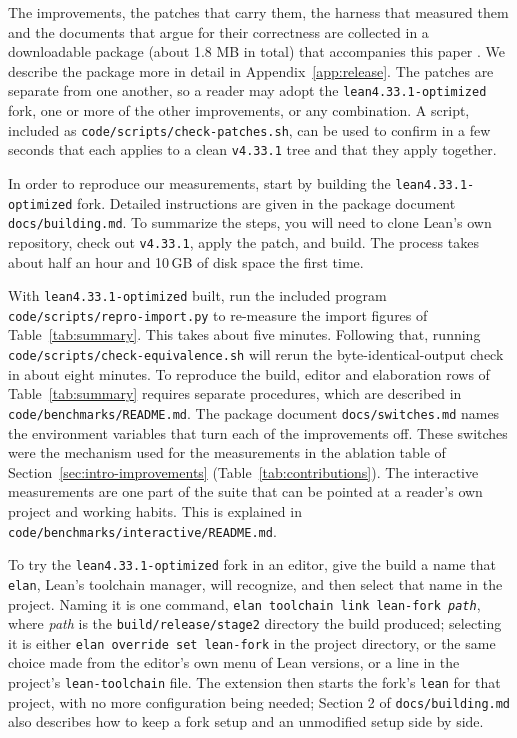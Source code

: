 \documentclass{article}
\newcommand{\Lean}{Lean\xspace}      %
\newcommand{\altlean}{\texttt{lean4.33.1-\allowbreak optimized}\xspace}
\begin{document}
The improvements, the patches that carry them, the harness that measured them and the documents
that argue for their correctness are collected in a downloadable package (about 1.8 MB in total) that accompanies this paper \cite{package}. We describe the package more in detail in Appendix~\ref{app:release}. The patches are separate from one another, so a
reader may adopt the \altlean fork, one or more of the other improvements, or any combination. A script, included as \texttt{code/scripts/\allowbreak check-patches.sh}, can be used to confirm in a few seconds that each applies to a clean \texttt{v4.33.1} tree and that they apply together.

In order to reproduce our measurements, start by building the \altlean fork. Detailed instructions are given in the package document \texttt{docs/building.md}. To summarize the steps, you will need to clone \Lean's own repository, check out \texttt{v4.33.1}, apply the patch, and build. The process takes about half an hour and 10\,GB of disk space the first time. 

With \altlean built, run the included program \texttt{code/scripts/repro-import.py} to re-measure the import figures of Table~\ref{tab:summary}. This takes about five minutes. Following that, running \texttt{code/scripts/\allowbreak check-equivalence.sh} will rerun the byte-identical-output check in about eight minutes. 
To reproduce the build, editor and elaboration rows of Table~\ref{tab:summary} requires separate procedures, which are described in \texttt{code/benchmarks/README.md}.
The package document \texttt{docs/switches.md} names the environment variables that turn each of the improvements off. These switches were the mechanism used for the measurements in the ablation table of Section~\ref{sec:intro-improvements} (Table~\ref{tab:contributions}). The interactive measurements are one part of the suite that can be pointed at a reader's own project and working habits. This is explained in \texttt{code/benchmarks/interactive/README.md}.

To try the \altlean fork in an editor, give the build a name that \texttt{elan}, \Lean's toolchain
manager, will recognize, and then select that name in the project. Naming it is one command,
\texttt{elan toolchain link lean-fork \emph{path}}, where \emph{path} is the
\texttt{build/release/stage2} directory the build produced; selecting it is either
\texttt{elan override set lean-fork} in the project directory, or the same choice made from the
editor's own menu of \Lean versions, or a line in the project's \texttt{lean-toolchain} file. The
extension then starts the fork's \texttt{lean} for that project, with no more configuration being
needed; Section 2 of \texttt{docs/building.md} also describes how to keep a fork setup and an unmodified setup side by side. 
\end{document}
